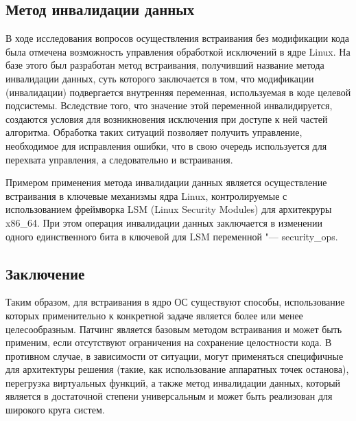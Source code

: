 \documentclass[10pt, a5paper]{article}
\begin{document}
\subsection*{Метод инвалидации данных}

В ходе исследования вопросов осуществления встраивания без модификации кода была отмечена возможность управления обработкой исключений в ядре Linux. На базе этого был разработан метод встраивания, получивший название метода инвалидации данных, суть которого заключается в том, что модификации (инвалидации) подвергается внутренняя переменная, используемая в коде целевой подсистемы. Вследствие того, что значение этой переменной инвалидируется, создаются условия для возникновения исключения при доступе к ней частей алгоритма. Обработка таких ситуаций позволяет получить управление, необходимое для исправления ошибки, что в свою очередь используется для перехвата управления, а следовательно и встраивания.

Примером применения метода инвалидации данных является осуществление встраивания в ключевые механизмы ядра Linux, контролируемые с использованием фреймворка LSM (Linux Security Modules) для архитекруры x86\_64. При этом операция инвалидации данных заключается в изменении одного единственного бита в ключевой для LSM переменной "--- security\_ops.

\subsection*{Заключение}

Таким образом, для встраивания в ядро ОС существуют способы, использование которых применительно к конкретной задаче является более или менее целесообразным. Патчинг является базовым методом встраивания и может быть применим, если отсутствуют ограничения на сохранение целостности кода. В противном случае, в зависимости от ситуации, могут применяться специфичные для архитектуры решения (такие, как использование аппаратных точек останова), перегрузка виртуальных функций, а также метод инвалидации данных, который является в достаточной степени универсальным и может быть реализован для широкого круга систем.
\end{document}
